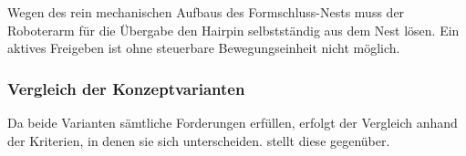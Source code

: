Wegen des rein mechanischen Aufbaus des Formschluss-Nests muss der Roboterarm für die Übergabe den Hairpin selbstständig aus
dem Nest lösen. Ein aktives Freigeben ist ohne steuerbare Bewegungseinheit nicht möglich.

\subsubsection{Vergleich der Konzeptvarianten}\label{sec:Variantenvergleich}
Da beide Varianten sämtliche Forderungen erfüllen, erfolgt der Vergleich anhand der
Kriterien, in denen sie sich unterscheiden.  stellt diese
gegenüber.

\newcommand{\bPP}{\ensuremath{\mathbf{{+}{+}}}}
\newcommand{\bP}{\ensuremath{{+}}}
\newcommand{\bM}{\ensuremath{{-}}}
\newcommand{\bMM}{\ensuremath{\mathbf{{-}{-}}}}


